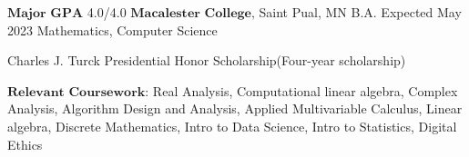 

\begin{cventries}

  \cventry
    {$\textbf{Major GPA }$4.0/4.0} %
    {$\textbf{Macalester College,}$ Saint Pual, MN} %
    {B.A. Expected May 2023} %
    {Mathematics, Computer Science} %
    {   
      \begin{cvitems} %
        \item {Charles J. Turck Presidential Honor Scholarship(Four-year scholarship)}
        \item {$\textbf{Relevant Coursework}$: Real Analysis, Computational linear algebra, Complex Analysis, Algorithm Design and Analysis, Applied Multivariable Calculus, Linear algebra, Discrete Mathematics, Intro to Data Science, Intro to Statistics, Digital Ethics}
      \end{cvitems}
    }

\end{cventries}
